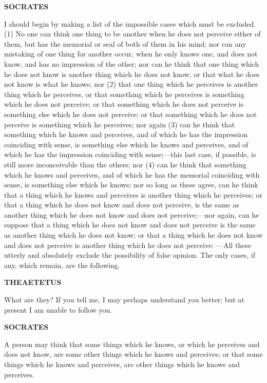 \documentclass[11pt,letter]{article}
\begin{document}
\par \textbf{SOCRATES}
\par   I should begin by making a list of the impossible cases which must be excluded. (1) No one can think one thing to be another when he does not perceive either of them, but has the memorial or seal of both of them in his mind; nor can any mistaking of one thing for another occur, when he only knows one, and does not know, and has no impression of the other; nor can he think that one thing which he does not know is another thing which he does not know, or that what he does not know is what he knows; nor (2) that one thing which he perceives is another thing which he perceives, or that something which he perceives is something which he does not perceive; or that something which he does not perceive is something else which he does not perceive; or that something which he does not perceive is something which he perceives; nor again (3) can he think that something which he knows and perceives, and of which he has the impression coinciding with sense, is something else which he knows and perceives, and of which he has the impression coinciding with sense;—this last case, if possible, is still more inconceivable than the others; nor (4) can he think that something which he knows and perceives, and of which he has the memorial coinciding with sense, is something else which he knows; nor so long as these agree, can he think that a thing which he knows and perceives is another thing which he perceives; or that a thing which he does not know and does not perceive, is the same as another thing which he does not know and does not perceive;—nor again, can he suppose that a thing which he does not know and does not perceive is the same as another thing which he does not know; or that a thing which he does not know and does not perceive is another thing which he does not perceive: —All these utterly and absolutely exclude the possibility of false opinion. The only cases, if any, which remain, are the following.

\par \textbf{THEAETETUS}
\par   What are they? If you tell me, I may perhaps understand you better; but at present I am unable to follow you.

\par \textbf{SOCRATES}
\par   A person may think that some things which he knows, or which he perceives and does not know, are some other things which he knows and perceives; or that some things which he knows and perceives, are other things which he knows and perceives.
\end{document}
